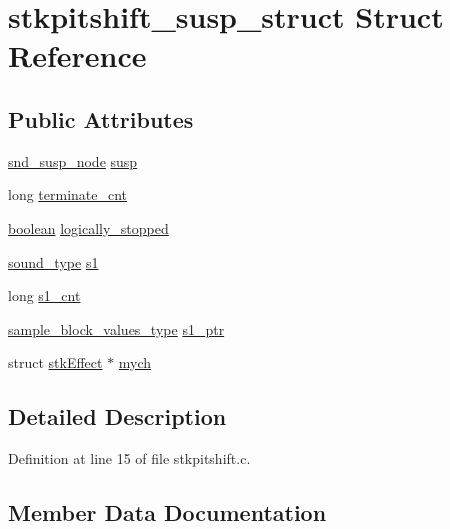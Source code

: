 \hypertarget{structstkpitshift__susp__struct}{}\section{stkpitshift\+\_\+susp\+\_\+struct Struct Reference}
\label{structstkpitshift__susp__struct}
\subsection*{Public Attributes}
\begin{DoxyCompactItemize}
\item 
\hyperlink{sound_8h_a6b268203688a934bd798ceb55f85d4c0}{snd\+\_\+susp\+\_\+node} \hyperlink{structstkpitshift__susp__struct_a424f756baf5b70f076b03d8559186e5a}{susp}
\item 
long \hyperlink{structstkpitshift__susp__struct_af2b98ec96caae83112e63dcab4cfd389}{terminate\+\_\+cnt}
\item 
\hyperlink{cext_8h_a7670a4e8a07d9ebb00411948b0bbf86d}{boolean} \hyperlink{structstkpitshift__susp__struct_ad14982e9bfbfb176d203b30c4ac099d6}{logically\+\_\+stopped}
\item 
\hyperlink{sound_8h_a792cec4ed9d6d636d342d9365ba265ea}{sound\+\_\+type} \hyperlink{structstkpitshift__susp__struct_a45ce494ddfcc4ff8474e97ca636fd2b8}{s1}
\item 
long \hyperlink{structstkpitshift__susp__struct_a576d774fdf6cb56660274e6bbb780537}{s1\+\_\+cnt}
\item 
\hyperlink{sound_8h_a83d17f7b465d1591f27cd28fc5eb8a03}{sample\+\_\+block\+\_\+values\+\_\+type} \hyperlink{structstkpitshift__susp__struct_a1e4ba71d9a5b4b3ed224f9efaf5aec81}{s1\+\_\+ptr}
\item 
struct \hyperlink{structstk_effect}{stk\+Effect} $\ast$ \hyperlink{structstkpitshift__susp__struct_a074517b69c414d5b32e1011fde91403f}{mych}
\end{DoxyCompactItemize}


\subsection{Detailed Description}


Definition at line 15 of file stkpitshift.\+c.



\subsection{Member Data Documentation}
